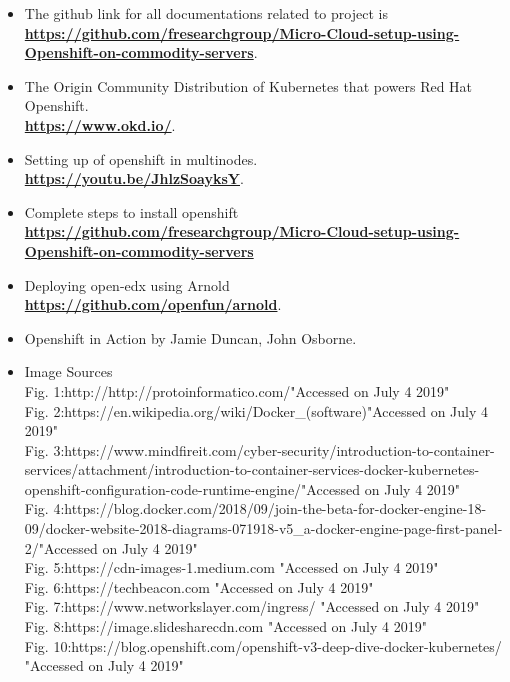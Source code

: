 \documentclass[11pt]{report}
\begin{document}
	\begin{itemize}
		\item The github link for all documentations related to project is
		\\
		\textbf{\href{https://github.com/fresearchgroup/Micro-Cloud-setup-using-Openshift-on-commodity-servers}{	https://github.com/fresearchgroup/Micro-Cloud-setup-using-Openshift-on-commodity-servers}}.
		\ \\
		
		\vspace{0.5cm}
		
		\item The Origin Community Distribution of Kubernetes that powers Red Hat Openshift.
		\\
		\textbf{ \href{https://www.okd.io/}{https://www.okd.io/}}.
		\vspace{0.5cm}
		\item Setting up of openshift in multinodes.
		\\
		\textbf{ \href{https://youtu.be/JhlzSoayksY}{https://youtu.be/JhlzSoayksY}}.
		\vspace{0.5cm}
		\item Complete steps to install openshift
		\\
		\textbf{\href{https://github.com/fresearchgroup/Micro-Cloud-setup-using-Openshift-on-commodity-servers}{https://github.com/fresearchgroup/Micro-Cloud-setup-using-Openshift-on-commodity-servers}}
		\vspace{0.5cm}
		\item Deploying open-edx using Arnold
		\\
		\textbf{ \href{https://github.com/openfun/arnold}{https://github.com/openfun/arnold}}.
		\vspace{0.5cm}
		\item Openshift in Action by Jamie Duncan, John Osborne.
		\item Image Sources \ \\
		Fig. 1:http://http://protoinformatico.com/"Accessed on July 4 2019"
		\ \\
		Fig. 2:https://en.wikipedia.org/wiki/Docker\_(software)"Accessed on July 4 2019"
		\ \\
		Fig. 3:https://www.mindfireit.com/cyber-security/introduction-to-container-services/attachment/introduction-to-container-services-docker-kubernetes-openshift-configuration-code-runtime-engine/"Accessed on July 4 2019"
		\ \\
		Fig. 4:https://blog.docker.com/2018/09/join-the-beta-for-docker-engine-18-09/docker-website-2018-diagrams-071918-v5\_a-docker-engine-page-first-panel-2/"Accessed on July 4 2019"
		\ \\
		Fig. 5:https://cdn-images-1.medium.com "Accessed on July 4 2019"
		\ \\
		Fig. 6:https://techbeacon.com "Accessed on July 4 2019"
		\ \\
		Fig. 7:https://www.networkslayer.com/ingress/ "Accessed on July 4 2019"
		\ \\
		Fig. 8:https://image.slidesharecdn.com "Accessed on July 4 2019"
		\ \\
		Fig. 10:https://blog.openshift.com/openshift-v3-deep-dive-docker-kubernetes/ "Accessed on July 4 2019"
		

\end{itemize}
\end{document}

